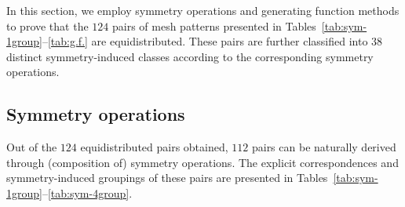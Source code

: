 \documentclass[12pt]{article}
\begin{document}
In this section, we employ symmetry operations and generating function methods to prove that the $124$ pairs of mesh patterns presented in Tables~\ref{tab:sym-1group}--\ref{tab:g.f.} are equidistributed. These pairs are further classified into $38$ distinct symmetry-induced classes according to the corresponding symmetry operations.

\subsection{Symmetry operations}
Out of the $124$ equidistributed pairs obtained, $112$ pairs can be naturally derived through (composition of) symmetry operations. The explicit correspondences and symmetry-induced groupings of these pairs are presented in Tables~\ref{tab:sym-1group}--\ref{tab:sym-4group}.
\end{document}
